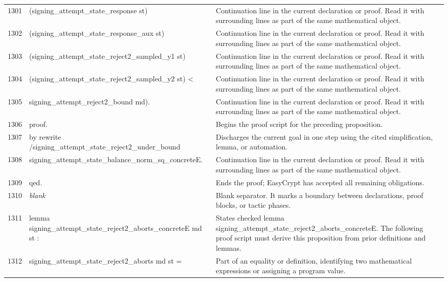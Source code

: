 \documentclass[10pt]{article}
\begin{document}
\begin{longtable}{r L{0.53\textwidth} L{0.37\textwidth}}
1301 & {\ttfamily\scriptsize     (signing\_attempt\_state\_response st)} & Continuation line in the current declaration or proof.  Read it with surrounding lines as part of the same mathematical object. \\
1302 & {\ttfamily\scriptsize     (signing\_attempt\_state\_response\_aux st)} & Continuation line in the current declaration or proof.  Read it with surrounding lines as part of the same mathematical object. \\
1303 & {\ttfamily\scriptsize     (signing\_attempt\_state\_reject2\_sampled\_y1 st)} & Continuation line in the current declaration or proof.  Read it with surrounding lines as part of the same mathematical object. \\
1304 & {\ttfamily\scriptsize     (signing\_attempt\_state\_reject2\_sampled\_y2 st) <} & Continuation line in the current declaration or proof.  Read it with surrounding lines as part of the same mathematical object. \\
1305 & {\ttfamily\scriptsize    signing\_attempt\_reject2\_bound md).} & Continuation line in the current declaration or proof.  Read it with surrounding lines as part of the same mathematical object. \\
1306 & {\ttfamily\scriptsize proof.} & Begins the proof script for the preceding proposition. \\
1307 & {\ttfamily\scriptsize by rewrite /signing\_attempt\_state\_reject2\_under\_bound} & Discharges the current goal in one step using the cited simplification, lemma, or automation. \\
1308 & {\ttfamily\scriptsize            signing\_attempt\_state\_balance\_norm\_sq\_concreteE.} & Continuation line in the current declaration or proof.  Read it with surrounding lines as part of the same mathematical object. \\
1309 & {\ttfamily\scriptsize qed.} & Ends the proof; EasyCrypt has accepted all remaining obligations. \\
1310 & {\ttfamily\scriptsize \emph{blank}} & Blank separator.  It marks a boundary between declarations, proof blocks, or tactic phases. \\
1311 & {\ttfamily\scriptsize lemma signing\_attempt\_state\_reject2\_aborts\_concreteE md st :} & States checked lemma signing\_attempt\_state\_reject2\_aborts\_concreteE.  The following proof script must derive this proposition from prior definitions and lemmas. \\
1312 & {\ttfamily\scriptsize   signing\_attempt\_state\_reject2\_aborts md st =} & Part of an equality or definition, identifying two mathematical expressions or assigning a program value. \\

\end{longtable}
\end{document}
